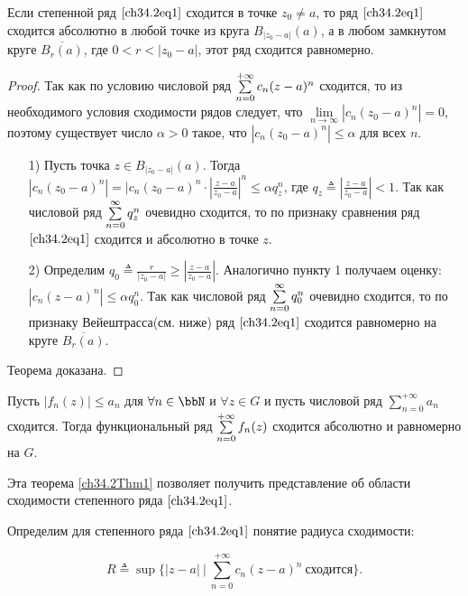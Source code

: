 \begin{thm}[Абель] \label{ch34.2Thm1}
Если степенной ряд $\eqref{ch34.2eq1}$ сходится в точке $z_0 \not= a$, то ряд $\eqref{ch34.2eq1}$ сходится абсолютно в любой точке из круга $B_{|z_0 - a|}(a)$, а в любом замкнутом круге $\overline{B_{r}(a)}$, где $0 < r < |z_0 - a|$, этот ряд сходится равномерно.
\end{thm}
\begin{proof}
Так как по условию числовой ряд $\sum_{n = 0}^{+\infty}\limits c_n (z - a)^n$ сходится, то из необходимого условия сходимости рядов следует, что $\lim\limits_{n \to \infty} |c_n(z_0 - a)^n| = 0$, поэтому существует число $\alpha > 0$ такое, что $|c_n(z_0 - a)^n| \le \alpha$ для всех $n$.
\begin{enumerate}
\item[1)] {\rightskip=3.5cm} { Пусть точка $z \in B_{|z_0 - a|}(a)$. Тогда $|c_n(z_0 - a)^n| = |c_n(z_0 - a)^n \cdot \left| \frac{z - a}{z_0 - a} \right|^n \le \alpha q^{n}_z$, где $q_z \triangleq \left| \frac{z - a}{z_0 - a} \right| < 1$. Так как числовой ряд $\sum_{n = 0}^{\infty}\limits q_{z}^n$ очевидно сходится, то по признаку сравнения ряд $\eqref{ch34.2eq1}$ сходится и абсолютно в точке $z$.
}
\item[2)] {\rightskip=0cm}Определим $q_0 \triangleq \frac{r}{|z_0 - a|}\ge\left|\frac{z - a}{z_0 - a}\right|$. Аналогично пункту 1 получаем оценку: $|c_n(z - a)^n| \le \alpha q^{n}_0$. Так как числовой ряд $\sum_{n = 0}^{\infty}\limits q_{0}^n$ очевидно сходится, то по признаку Вейештрасса(см. ниже) ряд $\eqref{ch34.2eq1}$ сходится равномерно на круге $\overline{B_{r}(a)}$.
\end{enumerate}
{\rightskip=-3.3cm} Теорема доказана.
\end{proof}

\begin{stt}
Пусть $|f_n(z)| \le a_n$ для $\forall n \in \bbN$ и $\forall z \in G$ и пусть числовой ряд $\sum\limits_{n = 0}^{+\infty} a_n$ сходится. Тогда функциональный ряд $\sum_{n = 0}^{+\infty}\limits f_n(z)$ сходится абсолютно и равномерно на $G$. 
\end{stt}

Эта теорема \ref{ch34.2Thm1} позволяет получить представление об области сходимости степенного ряда $\eqref{ch34.2eq1}$.

Определим для степенного ряда $\eqref{ch34.2eq1}$ понятие $\textit{радиуса сходимости}$:

\begin{equation} \label{ch34.2eq2}
R \triangleq \sup \{ |z - a| \: \big| \: \sum_{n = 0}^{+\infty} c_n (z - a)^n \: \text{сходится} \}.
\end{equation}

